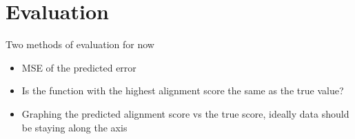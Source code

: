 \chapter{Evaluation}
Two methods of evaluation for now
\begin{itemize}
    \item MSE of the predicted error
    \item Is the function with the highest alignment score the same as the true value?
    \item Graphing the predicted alignment score vs the true score, ideally data should be staying along the axis
\end{itemize}
